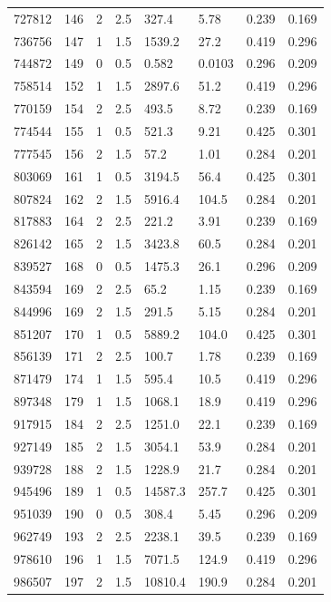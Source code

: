 \documentclass[preview]{standalone}
\begin{document}
{{{\begin{tabular}{L{1.2cm}C{1.2cm} C{0.3cm}C{0.5cm} C{1.4cm}C{1.4cm} C{1.4cm}C{1.4cm}}
  727812  &   146  & 2     & 2.5 &  327.4  & 5.78  & 0.239 &  0.169   \\ 
  736756  &   147  & 1     & 1.5 &  1539.2  & 27.2  & 0.419 &  0.296   \\ 
  744872  &   149  & 0     & 0.5 &  0.582  & 0.0103  & 0.296 &  0.209   \\ 
  758514  &   152  & 1     & 1.5 &  2897.6  & 51.2  & 0.419 &  0.296   \\ 
  770159  &   154  & 2     & 2.5 &  493.5  & 8.72  & 0.239 &  0.169   \\ 
  774544  &   155  & 1     & 0.5 &  521.3  & 9.21  & 0.425 &  0.301   \\ 
  777545  &   156  & 2     & 1.5 &  57.2  & 1.01  & 0.284 &  0.201   \\ 
  803069  &   161  & 1     & 0.5 &  3194.5  & 56.4  & 0.425 &  0.301   \\ 
  807824  &   162  & 2     & 1.5 &  5916.4  & 104.5  & 0.284 &  0.201   \\ 
  817883  &   164  & 2     & 2.5 &  221.2  & 3.91  & 0.239 &  0.169   \\ 
  826142  &   165  & 2     & 1.5 &  3423.8  & 60.5  & 0.284 &  0.201   \\ 
  839527  &   168  & 0     & 0.5 &  1475.3  & 26.1  & 0.296 &  0.209   \\ 
  843594  &   169  & 2     & 2.5 &  65.2  & 1.15  & 0.239 &  0.169   \\ 
  844996  &   169  & 2     & 1.5 &  291.5  & 5.15  & 0.284 &  0.201   \\ 
  851207  &   170  & 1     & 0.5 &  5889.2  & 104.0  & 0.425 &  0.301   \\ 
  856139  &   171  & 2     & 2.5 &  100.7  & 1.78  & 0.239 &  0.169   \\ 
  871479  &   174  & 1     & 1.5 &  595.4  & 10.5  & 0.419 &  0.296   \\ 
  897348  &   179  & 1     & 1.5 &  1068.1  & 18.9  & 0.419 &  0.296   \\ 
  917915  &   184  & 2     & 2.5 &  1251.0  & 22.1  & 0.239 &  0.169   \\ 
  927149  &   185  & 2     & 1.5 &  3054.1  & 53.9  & 0.284 &  0.201   \\ 
  939728  &   188  & 2     & 1.5 &  1228.9  & 21.7  & 0.284 &  0.201   \\ 
  945496  &   189  & 1     & 0.5 &  14587.3  & 257.7  & 0.425 &  0.301   \\ 
  951039  &   190  & 0     & 0.5 &  308.4  & 5.45  & 0.296 &  0.209   \\ 
  962749  &   193  & 2     & 2.5 &  2238.1  & 39.5  & 0.239 &  0.169   \\ 
  978610  &   196  & 1     & 1.5 &  7071.5  & 124.9  & 0.419 &  0.296   \\ 
  986507  &   197  & 2     & 1.5 &  10810.4  & 190.9  & 0.284 &  0.201   \\ 
\hline 
\end{tabular} 

}}}
\end{document}
